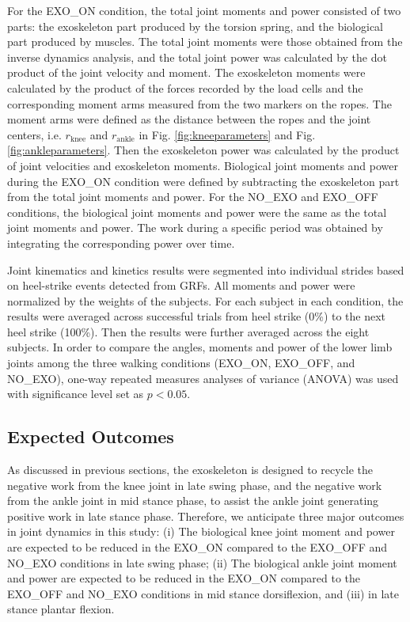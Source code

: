 \documentclass[10pt]{asme2ej}
\begin{document}
For the EXO\_ON condition, the total joint moments and power consisted of two parts: the exoskeleton part produced by the torsion spring, and the biological part produced by muscles.
The total joint moments were those obtained from the inverse dynamics analysis, and the total joint power was calculated by the dot product of the joint velocity and moment.
The exoskeleton moments were calculated by the product of the forces recorded by the load cells and the corresponding moment arms measured from the two markers on the ropes.
The moment arms were defined as the distance between the ropes and the joint centers, i.e. $r_\mathrm{knee}$ and $r_\mathrm{ankle}$ in Fig. \ref{fig:kneeparameters} and Fig. \ref{fig:ankleparameters}.
Then the exoskeleton power was calculated by the product of joint velocities and exoskeleton moments.
Biological joint moments and power during the EXO\_ON condition were defined by subtracting the exoskeleton part from the total joint moments and power.
For the NO\_EXO and EXO\_OFF conditions, the biological joint moments and power were the same as the total joint moments and power.
The work during a specific period was obtained by integrating the corresponding power over time.

Joint kinematics and kinetics results were segmented into individual strides based on heel-strike events detected from GRFs.
All moments and power were normalized by the weights of the subjects.
For each subject in each condition, the results were averaged across successful trials from heel strike (0\%) to the next heel strike (100\%).
Then the results were further averaged across the eight subjects.
In order to compare the angles, moments and power of the lower limb joints among the three walking conditions (EXO\_ON, EXO\_OFF, and NO\_EXO), one-way repeated measures analyses of variance (ANOVA) was used with significance level set as $p<0.05$.

\subsection{Expected Outcomes}

As discussed in previous sections, the exoskeleton is designed to recycle the negative work from the knee joint in late swing phase, and the negative work from the ankle joint in mid stance phase, to assist the ankle joint generating positive work in late stance phase.
Therefore, we anticipate three major outcomes in joint dynamics in this study:
(i) The biological knee joint moment and power are expected to be reduced in the EXO\_ON compared to the EXO\_OFF and NO\_EXO conditions in late swing phase;
(ii) The biological ankle joint moment and power are expected to be reduced in the EXO\_ON compared to the EXO\_OFF and NO\_EXO conditions in mid stance dorsiflexion, and (iii) in late stance plantar flexion.
\end{document}
